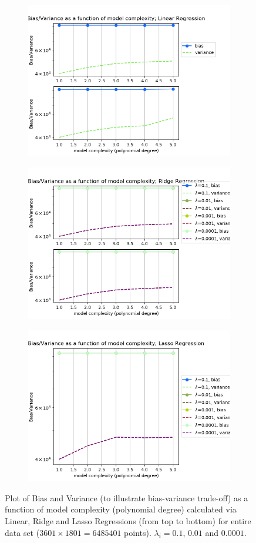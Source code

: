 \begin{figure}[!ht]
\begin{subfigure}{\textwidth}
  \centering
  \includegraphics[width=0.7\linewidth]{images/real/real_linear_bv_p05_nreal.png}
\end{subfigure}
\begin{subfigure}{\textwidth}
  \centering
  \includegraphics[width=0.7\linewidth]{images/real/real_ridge_bv_p05_nreal.png}
\end{subfigure}
\begin{subfigure}{\textwidth}
  \centering
  \includegraphics[width=0.7\linewidth]{images/real/real_lasso_bv_p05_nreal.png}
\end{subfigure}
\caption{Plot of Bias and Variance (to illustrate bias-variance trade-off) as a function of model complexity (polynomial degree) calculated via Linear, Ridge and Lasso Regressions (from top to bottom) for entire data set ($3601\times1801 = 6485401$ points). $\lambda_i = 0.1$, $0.01$ and $0.0001$.}
\label{fig:real-bias-all}
\end{figure}

